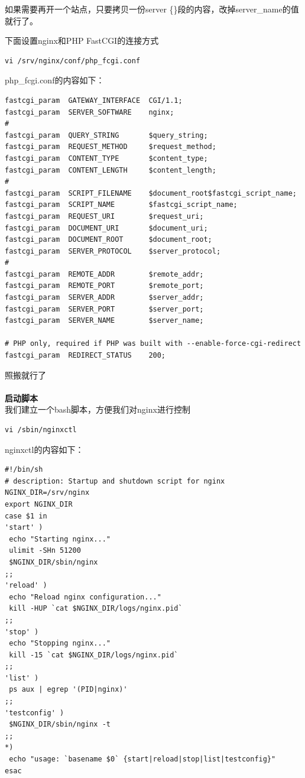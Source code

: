 \documentclass{article}
\begin{document}
如果需要再开一个站点，只要拷贝一份server \{\}段的内容，改掉server\_name的值就行了。

下面设置nginx和PHP FastCGI的连接方式

\begin{verbatim}
vi /srv/nginx/conf/php_fcgi.conf
\end{verbatim}
php\_fcgi.conf的内容如下：

\begin{verbatim}
fastcgi_param  GATEWAY_INTERFACE  CGI/1.1;
fastcgi_param  SERVER_SOFTWARE    nginx;
#
fastcgi_param  QUERY_STRING       $query_string;
fastcgi_param  REQUEST_METHOD     $request_method;
fastcgi_param  CONTENT_TYPE       $content_type;
fastcgi_param  CONTENT_LENGTH     $content_length;
# 
fastcgi_param  SCRIPT_FILENAME    $document_root$fastcgi_script_name;
fastcgi_param  SCRIPT_NAME        $fastcgi_script_name;
fastcgi_param  REQUEST_URI        $request_uri;
fastcgi_param  DOCUMENT_URI       $document_uri;
fastcgi_param  DOCUMENT_ROOT      $document_root;
fastcgi_param  SERVER_PROTOCOL    $server_protocol;
# 
fastcgi_param  REMOTE_ADDR        $remote_addr;
fastcgi_param  REMOTE_PORT        $remote_port;
fastcgi_param  SERVER_ADDR        $server_addr;
fastcgi_param  SERVER_PORT        $server_port;
fastcgi_param  SERVER_NAME        $server_name;
 
# PHP only, required if PHP was built with --enable-force-cgi-redirect
fastcgi_param  REDIRECT_STATUS    200;
\end{verbatim}
照搬就行了

\paragraph{}\textbf{启动脚本}\\

我们建立一个bash脚本，方便我们对nginx进行控制

\begin{verbatim}
vi /sbin/nginxctl
\end{verbatim}
nginxctl的内容如下：

\begin{verbatim}
#!/bin/sh
# description: Startup and shutdown script for nginx
NGINX_DIR=/srv/nginx
export NGINX_DIR
case $1 in
'start' )
 echo "Starting nginx..."
 ulimit -SHn 51200
 $NGINX_DIR/sbin/nginx
;;
'reload' )
 echo "Reload nginx configuration..."
 kill -HUP `cat $NGINX_DIR/logs/nginx.pid`
;;
'stop' )
 echo "Stopping nginx..."
 kill -15 `cat $NGINX_DIR/logs/nginx.pid`
;;
'list' )
 ps aux | egrep '(PID|nginx)'
;;
'testconfig' )
 $NGINX_DIR/sbin/nginx -t
;;
*)
 echo "usage: `basename $0` {start|reload|stop|list|testconfig}"
esac 
\end{verbatim}
\end{document}
